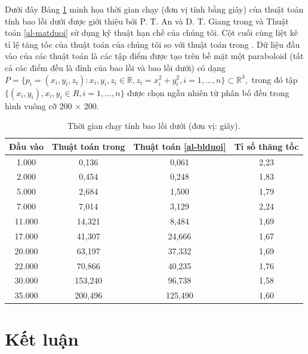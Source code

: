 \documentclass[12pt,a4paper,openany,oneside]{report}
\begin{document}
Dưới đây Bảng \ref{tab:51} minh họa thời gian chạy (đơn vị tính bằng giây) của thuật toán tính bao lồi dưới được giới thiệu bởi P. T. An và D. T. Giang trong \cite{An-Giang} và Thuật toán \ref{al-matduoi} sử dụng kỹ thuật hạn chế của chúng tôi. Cột cuối cùng liệt kê tỉ lệ tăng tốc của thuật toán của chúng tôi so với thuật toán trong \cite{An-Giang}. Dữ liệu đầu vào của các thuật toán là các tập điểm được tạo trên bề mặt một paraboloid (tất cả các điểm đều là đỉnh của bao lồi và bao lồi dưới) có dạng $P = \{p_i = (x_i, y_i, z_i): x_i, y_i, z_i \in \mathbb{R}, z_i = x_i^2 + y_i^2, i = 1, \ldots, n\} \subset \mathbb{R}^3,$ trong đó tập $\{(x_i, y_i), x_i, y_i \in R, i = 1, \ldots , n \}$ được chọn ngẫu nhiên từ phân bố đều trong hình vuông cỡ 200 $\times$ 200. 

{\fontsize{12pt}{12pt}\selectfont \baselineskip 0.65cm
	\renewcommand{\baselinestretch}{1}
	\begin{table}[ht!]
		\begin{center}
			\caption{Thời gian chạy tính bao lồi dưới (đơn vị: giây).}
			\label{tab:51}
			\begin{tabular}{cccc}
				\hline
				{Đầu vào} &{Thuật toán trong} \cite{An-Giang} & {Thuật toán} \ref{al-blduoi}& Tỉ số thăng tốc\\
				\hline
				1.000 & 0,136& 0,061&2,23\\ 
				2.000 & 0,454& 0,248 &1,83\\  
				5.000 & 2,684& 1,500 &1,79\\  
				7.000 & 7,014& 3,129 &2,24\\ 
				11.000  & 14,321& 8,484 &1,69\\ 
				17.000  & 41,307& 24,666 &1,67\\ 
				20.000 & 63,197& 37,332 &1,69\\  
				22.000 & 70,866& 40,235 & 1,76\\ 
				30.000 & 153,240& 96,738 &1,58\\ 
				35.000& 200,496& 125,490& 1,60\\ \hline	
			\end{tabular}	
		\end{center}
	\end{table}	
}







\chapter*{{Kết luận}}
\end{document}
